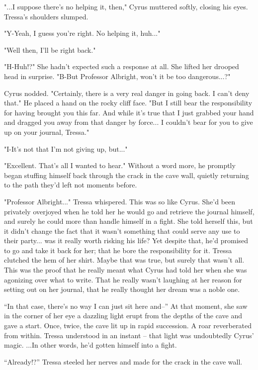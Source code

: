 "...I suppose there's no helping it, then," Cyrus muttered softly, closing his eyes. Tressa's shoulders slumped.

"Y-Yeah, I guess you're right. No helping it, huh..."

"Well then, I'll be right back."

"H-Huh!?" She hadn't expected such a response at all. She lifted her drooped head in surprise. "B-But Professor Albright, won't it be too dangerous...?"

Cyrus nodded. "Certainly, there is a very real danger in going back. I can't deny that." He placed a hand on the rocky cliff face. "But I still bear the responsibility for having brought you this far. And while it's true that I just grabbed your hand and dragged you away from that danger by force... I couldn't bear for you to give up on your journal, Tressa."

"I-It's not that I'm not giving up, but..."

"Excellent. That's all I wanted to hear." Without a word more, he promptly began stuffing himself back through the crack in the cave wall, quietly returning to the path they'd left not moments before.

"Professor Albright..." Tressa whispered. This was so like Cyrus. She'd been privately overjoyed when he told her he would go and retrieve the journal himself, and surely he could more than handle himself in a fight. She told herself this, but it didn't change the fact that it wasn't something that could serve any use to their party... was it really worth risking his life? Yet despite that, he'd promised to go and take it back for her; that he bore the responsibility for it. Tressa clutched the hem of her shirt. Maybe that was true, but surely that wasn't all. This was the proof that he really meant what Cyrus had told her when she was agonizing over what to write. That he really wasn't laughing at her reason for setting out on her journal, that he really thought her dream was a noble one.

``In that case, there's no way I can just sit here and--'' At that moment, she saw in the corner of her eye a dazzling light erupt from the depths of the cave and gave a start. Once, twice, the cave lit up in rapid succession. A roar reverberated from within. Tressa understood in an instant -- that light was undoubtedly Cyrus' magic. ...In other words, he'd gotten himself into a fight.

``Already!?'' Tressa steeled her nerves and made for the crack in the cave wall.

